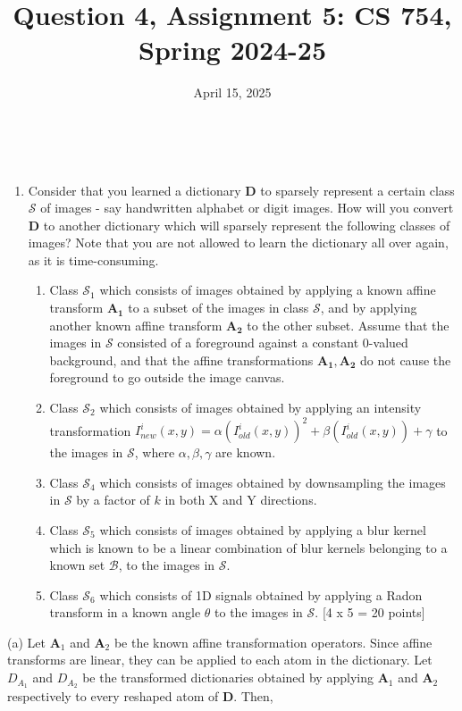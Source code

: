 \documentclass{article}
\title{Question 4, Assignment 5: CS 754, Spring 2024-25}
\author{
\IEEEauthorblockN{
    \begin{tabular}{cccc}
        \begin{minipage}[t]{0.23\textwidth}
            \centering
            Amitesh Shekhar\\
            IIT Bombay\\
            22b0014@iitb.ac.in
        \end{minipage} & 
        \begin{minipage}[t]{0.23\textwidth}
            \centering
            Anupam Rawat\\
            IIT Bombay\\
            22b3982@iitb.ac.in
        \end{minipage} & 
        \begin{minipage}[t]{0.23\textwidth}
            \centering
            Toshan Achintya Golla\\
            IIT Bombay\\
            22b2234@iitb.ac.in
        \end{minipage} \\
        \\ 
    \end{tabular}
}
}
\date{April 15, 2025}
\begin{document}
\maketitle

\\


\begin{enumerate}
\item Consider that you learned a dictionary $\boldsymbol{D}$ to sparsely represent a certain class $\mathcal{S}$ of images - say handwritten alphabet or digit images. How will you convert $\boldsymbol{D}$ to another dictionary which will sparsely represent the following classes of images? Note that you are not allowed to learn the dictionary all over again, as it is time-consuming. 
\begin{enumerate}
\item Class $\mathcal{S}_1$ which consists of images obtained by applying a known affine transform $\boldsymbol{A_1}$ to a subset of the images in class $\mathcal{S}$, and by applying another known affine transform $\boldsymbol{A_2}$ to the other subset. Assume that the images in $\mathcal{S}$ consisted of a foreground against a constant 0-valued background, and that the affine transformations $\boldsymbol{A_1}, \boldsymbol{A_2}$ do not cause the foreground to go outside the image canvas. 
\item Class $\mathcal{S}_2$ which consists of images obtained by applying an intensity transformation $I^i_{new}(x,y) = \alpha (I^i_{old}(x,y))^2 + \beta (I^i_{old}(x,y)) + \gamma$ to the images in $\mathcal{S}$, where $\alpha,\beta,\gamma$ are known.  
\item Class $\mathcal{S}_4$ which consists of images obtained by downsampling the images in $\mathcal{S}$ by a factor of $k$ in both X and Y directions. 
\item Class $\mathcal{S}_5$ which consists of images obtained by applying a blur kernel which is known to be a linear combination of blur kernels belonging to a known set $\mathcal{B}$, to the images in $\mathcal{S}$. 
\item Class $\mathcal{S}_6$ which consists of 1D signals obtained by applying a Radon transform in a known angle $\theta$ to the images in $\mathcal{S}$. 
\textsf{[4 x 5 = 20 points]}
\end{enumerate}
\end{enumerate}
\noindent (a) Let $\boldsymbol{A}_1$ and $\boldsymbol{A}_2$ be the known affine transformation operators. Since affine transforms are linear, they can be applied to each atom in the dictionary. Let $D_{A_1}$ and $D_{A_2}$ be the transformed dictionaries obtained by applying $\boldsymbol{A}_1$ and $\boldsymbol{A}_2$ respectively to every reshaped atom of $\boldsymbol{D}$. Then,
\end{document}
